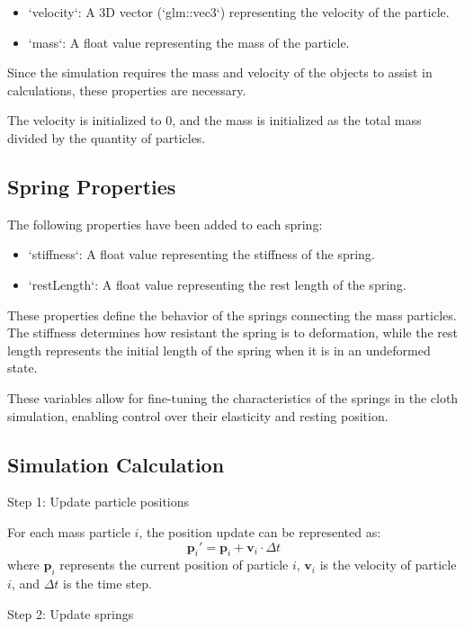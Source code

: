 \documentclass[acmtog]{acmart}
\begin{document}
\begin{itemize}
\item `velocity`: A 3D vector (`glm::vec3`) representing the velocity of the particle.
\item `mass`: A float value representing the mass of the particle.
\end{itemize}

Since the simulation requires the mass and velocity of the objects to assist in calculations, these properties are necessary.

The velocity is initialized to 0, and the mass is initialized as the total mass divided by the quantity of particles.

\subsection{Spring Properties}

The following properties have been added to each spring:

\begin{itemize}
\item `stiffness`: A float value representing the stiffness of the spring.
\item `restLength`: A float value representing the rest length of the spring.
\end{itemize}

These properties define the behavior of the springs connecting the mass particles. The stiffness determines how resistant the spring is to deformation, while the rest length represents the initial length of the spring when it is in an undeformed state.

These variables allow for fine-tuning the characteristics of the springs in the cloth simulation, enabling control over their elasticity and resting position.

\subsection{Simulation Calculation}

Step 1: Update particle positions

For each mass particle \(i\), the position update can be represented as:
\[
\mathbf{p}_i' = \mathbf{p}_i + \mathbf{v}_i \cdot \Delta t
\]
where \(\mathbf{p}_i\) represents the current position of particle \(i\), \(\mathbf{v}_i\) is the velocity of particle \(i\), and \(\Delta t\) is the time step.

Step 2: Update springs
\end{document}
